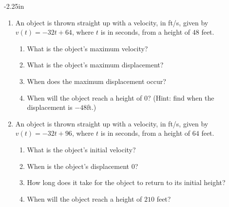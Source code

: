 \begin{adjustwidth*}{}{-2.25in}
\begin{multicols*}{2}
\begin{enumerate}[1),start=5]
\item An object is thrown straight up with a velocity, in ft/s, given by $v(t) = -32t+64$, where $t$ is in seconds, from a height of $48$ feet.
\begin{enumerate}
\item		What is the object's maximum velocity?
\item		What is the object's maximum displacement?
\item		When does the maximum displacement occur?
\item		When will the object reach a height of 0? (Hint: find when the displacement is $-48$ft.)
\end{enumerate}

\item An object is thrown straight up with a velocity, in ft/s, given by $v(t) = -32t+96$, where $t$ is in seconds, from a height of $64$ feet.
\begin{enumerate}
\item		What is the object's initial velocity?
\item		When is the object's displacement $0$?
\item		How long does it take for the object to return to its initial height?
\item		When will the object reach a height of $210$ feet?
\end{enumerate}
\end{enumerate}

\end{multicols*}
\end{adjustwidth*}

\afterexercises